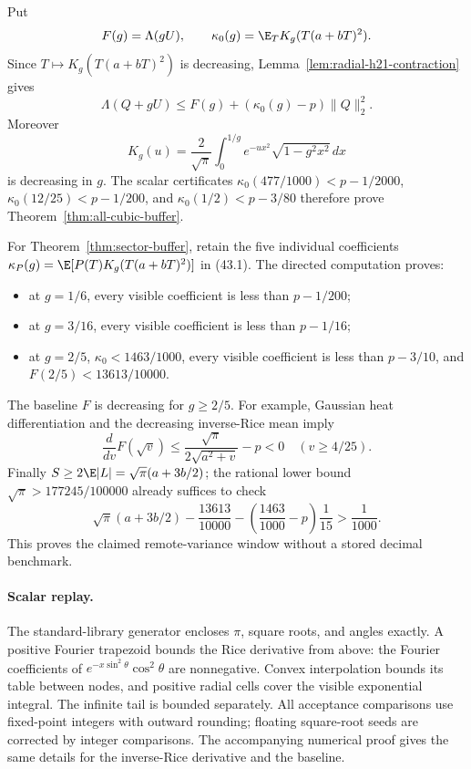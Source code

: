 Put
\[
 F(g)=\Lambda(gU),\qquad
 \kappa_0(g)=\E_T K_g(T(a+bT)^2).
\]
Since $T\mapsto K_g(T(a+bT)^2)$ is decreasing,
Lemma~\ref{lem:radial-h21-contraction} gives
\[
 \boxed{\Lambda(Q+gU)\le
        F(g)+(\kappa_0(g)-p)\|Q\|_2^2.}                \tag{43.3}
\]
Moreover
\[
 K_g(u)=\frac2{\sqrt\pi}
       \int_0^{1/g}e^{-ux^2}\sqrt{1-g^2x^2}\,dx
\]
is decreasing in $g$. The scalar certificates
$\kappa_0(477/1000)<p-1/2000$,
$\kappa_0(12/25)<p-1/200$, and
$\kappa_0(1/2)<p-3/80$ therefore prove
Theorem~\ref{thm:all-cubic-buffer}.

For Theorem~\ref{thm:sector-buffer}, retain the five individual
coefficients $\kappa_P(g)=\E[P(T)K_g(T(a+bT)^2)]$ in (43.1).
The directed computation proves:
\begin{itemize}
\item at $g=1/6$, every visible coefficient is less than $p-1/200$;
\item at $g=3/16$, every visible coefficient is less than $p-1/16$;
\item at $g=2/5$, $\kappa_0<1463/1000$, every visible coefficient
is less than $p-3/10$, and $F(2/5)<13613/10000$.
\end{itemize}
The baseline $F$ is decreasing for $g\ge2/5$. For example, Gaussian
heat differentiation and the decreasing inverse-Rice mean imply
\[
 \frac{d}{dv}F(\sqrt v)
 \le \frac{\sqrt\pi}{2\sqrt{a^2+v}}-p<0
       \quad(v\ge4/25).
\]
Finally $S\ge2\E|L|=\sqrt\pi(a+3b/2)$; the rational lower
bound $\sqrt\pi>177245/100000$ already suffices to check
\[
 \sqrt\pi(a+3b/2)
 -\frac{13613}{10000}
 -\left(\frac{1463}{1000}-p\right)\frac1{15}>\frac1{1000}.
\]
This proves the claimed remote-variance window without a stored decimal
benchmark.

\paragraph{Scalar replay.}
The standard-library generator encloses $\pi$, square roots, and angles
exactly. A positive Fourier trapezoid bounds the Rice derivative from
above: the Fourier coefficients of
$e^{-x\sin^2\theta}\cos^2\theta$ are nonnegative.
Convex interpolation bounds its table between nodes, and positive
radial cells cover the visible exponential integral. The infinite tail
is bounded separately. All acceptance comparisons use fixed-point
integers with outward rounding; floating square-root seeds are corrected
by integer comparisons. The accompanying numerical proof gives the
same details for the inverse-Rice derivative and the baseline.

